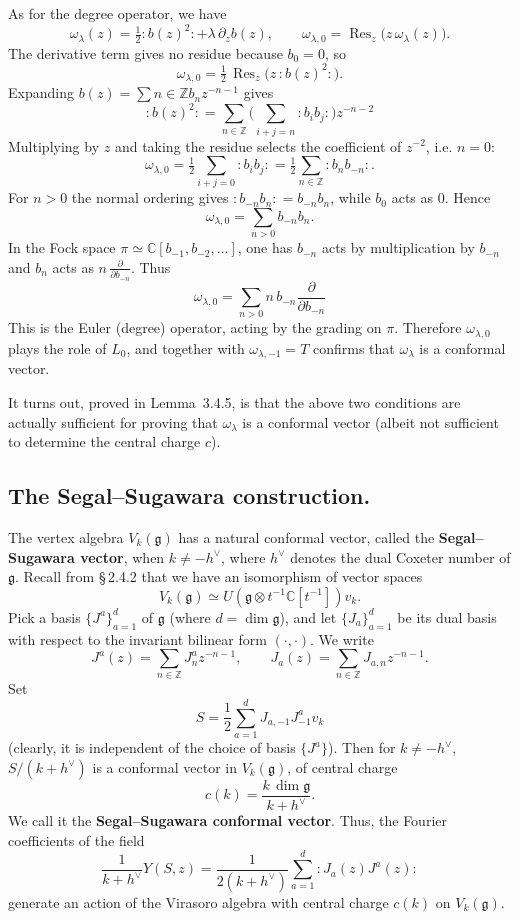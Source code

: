 \documentclass[12pt]{article}
\begin{document}
\begin{example}
As for the degree operator, we have
\[
\omega_\lambda(z) = \tfrac12:b(z)^2: + \lambda\,\partial_z b(z),
\qquad
\omega_{\lambda,0} = \operatorname{Res}_z\big(z\,\omega_\lambda(z)\big).
\]
The derivative term gives no residue because $b_0=0$, so
\[
\omega_{\lambda,0} = \tfrac12\,\operatorname{Res}_z\big(z\,:b(z)^2:\big).
\]
Expanding $b(z)=\sum{n\in\mathbb Z} b_n z^{-n-1}$ gives
\[:b(z)^2: = \sum_{n\in\mathbb Z}\Big(\sum_{i+j=n} :b_i b_j:\Big) z^{-n-2}\]
Multiplying by $z$ and taking the residue selects the coefficient of $z^{-2}$, i.e. $n=0$:
\[
\omega_{\lambda,0} = \tfrac12\sum_{i+j=0} :b_i b_j: = \tfrac12\sum_{n\in\mathbb Z} :b_n b_{-n}:.
\]
For $n>0$ the normal ordering gives $:b_{-n}b_n: = b_{-n}b_n$, while $b_0$ acts as $0$. Hence
\[
\omega_{\lambda,0} = \sum_{n>0} b_{-n}b_n.
\]
In the Fock space $\pi\simeq\mathbb C[b_{-1},b_{-2},\dots]$, one has $b_{-n}$ acts by multiplication by $b_{-n}$ and
$b_n$ acts as $n\,\frac{\partial}{\partial b_{-n}}$. Thus
\[
\omega_{\lambda,0} = \sum_{n>0} n\,b_{-n}\frac{\partial}{\partial b_{-n}}
\]
This is the Euler (degree) operator, acting by the grading on $\pi$.  Therefore $\omega_{\lambda,0}$ plays the role of $L_0$, and together with $\omega_{\lambda,-1}=T$ confirms that $\omega_\lambda$ is a conformal vector.

It turns out, proved in Lemma~3.4.5, is that the above two conditions are actually sufficient for proving that $\omega_\lambda$ is a conformal vector (albeit not sufficient to determine the central charge $c$).
\end{example}



\subsection{The Segal--Sugawara construction.}
The vertex algebra $V_k(\mathfrak{g})$ has a natural conformal vector,
called the \textbf{Segal--Sugawara vector}, when $k\ne -h^\vee$,
where $h^\vee$ denotes the dual Coxeter number of $\mathfrak{g}$.
Recall from \S\,2.4.2 that we have an isomorphism of vector spaces
\[
V_k(\mathfrak{g})
\simeq U(\mathfrak{g}\otimes t^{-1}\mathbb{C}[t^{-1}])v_k.
\]
Pick a basis $\{J^a\}_{a=1}^d$ of $\mathfrak{g}$ (where $d=\dim\mathfrak{g}$),
and let $\{J_a\}_{a=1}^d$ be its dual basis with respect to the invariant
bilinear form $(\cdot,\cdot)$.
We write
\[
J^a(z) = \sum_{n\in\mathbb{Z}} J^a_n z^{-n-1},
\qquad
J_a(z) = \sum_{n\in\mathbb{Z}} J_{a,n} z^{-n-1}.
\]
Set
\begin{equation}\label{2.5.5}
S = \frac{1}{2}\sum_{a=1}^d J_{a,-1}J^a_{-1}v_k
\end{equation}
(clearly, it is independent of the choice of basis $\{J^a\}$).
Then for $k\ne -h^\vee$, $S/(k+h^\vee)$ is a conformal vector in
$V_k(\mathfrak{g})$, of central charge
\[
c(k) = \frac{k\,\dim\mathfrak{g}}{k+h^\vee}.
\]
We call it the \textbf{Segal--Sugawara conformal vector}.
Thus, the Fourier coefficients of the field
\begin{equation}\label{2.5.6}
\frac{1}{k+h^\vee}Y(S,z)
= \frac{1}{2(k+h^\vee)}\sum_{a=1}^d :J_a(z)J^a(z):
\end{equation}
generate an action of the Virasoro algebra with central charge $c(k)$ on
$V_k(\mathfrak{g})$.
\end{document}
